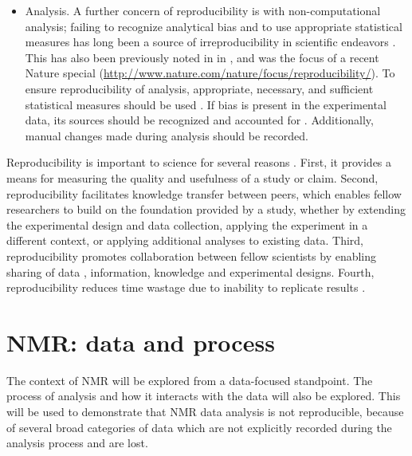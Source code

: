 \begin{itemize}
  \item Analysis.  A further concern of reproducibility is with 
  non-computational analysis; failing to recognize analytical bias and to 
  use appropriate statistical measures has long been a source of 
  irreproducibility in scientific endeavors \cite{sackett1979bias}.
  This has also been previously noted in \cite{ioannidis2005most} 
  in \cite{nuzzo2014statistical, begley2013reproducibility}, 
  and was the focus of a recent Nature special 
  (\url{http://www.nature.com/nature/focus/reproducibility/}).
  To ensure reproducibility of analysis, appropriate, necessary, and sufficient
  statistical measures should be used
  \cite{pashler2012replicability, vaux2012numbers}.
  If bias is present in the experimental data, its sources should be recognized
  and accounted for \cite{macarthur2012reproducibility, wagenmakers2012agenda}.
  Additionally, manual changes made during analysis should be recorded.

\end{itemize}

Reproducibility is important to science for several reasons 
\cite{borgman2012conundrum}.  First, it 
provides a means for measuring the quality and usefulness of a study or 
claim.  Second, reproducibility facilitates knowledge transfer between 
peers, which enables fellow researchers to build on the foundation provided 
by a study, whether by extending the experimental design and data collection, 
applying the experiment in a different context, or applying additional analyses 
to existing data.  Third, reproducibility promotes collaboration between fellow 
scientists by enabling sharing of data \cite{rung2013reuse}, 
information, knowledge and experimental 
designs.  Fourth, reproducibility reduces time wastage due to inability to 
replicate results 
\cite{ioannidis2005most, mullard2011reliability, prinz2011reproducibility,
begley2012drug}. 


\section{NMR: data and process}
The context of NMR will be explored from a data-focused standpoint.  The
process of analysis and how it interacts with the data will also be explored.
This will be used to demonstrate that NMR data analysis is not reproducible,
because of several broad categories of data which are not explicitly 
recorded during the analysis process and are lost.


